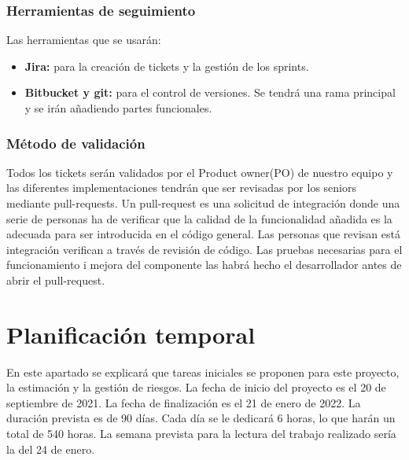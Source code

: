 \documentclass[12pt]{article}
\begin{document}
    \subsubsection{Herramientas de seguimiento}	
    Las herramientas que se usarán:
    \begin{itemize}
        \item \textbf{Jira:} para la creación de tickets y la gestión de los sprints.
        \item \textbf{Bitbucket y git:} para el control de versiones. Se tendrá una rama principal y se irán añadiendo partes funcionales.
    \end{itemize}

    \subsubsection{Método de validación}
    Todos los tickets serán validados por el Product owner(PO) de nuestro equipo y las diferentes implementaciones tendrán que ser revisadas por los seniors mediante pull-requests. Un pull-request es una solicitud de integración donde una serie de personas ha de verificar que la calidad de la funcionalidad añadida es la adecuada para ser introducida en el código general. Las personas que revisan está integración verifican a través de revisión de código. Las pruebas necesarias para el funcionamiento i mejora del componente las habrá hecho el desarrollador antes de abrir el pull-request. 
    \clearpage
    \section{Planificación temporal}\label{sec:Planificación temporal}
    En este apartado se explicará que tareas iniciales se proponen para este proyecto, la estimación y la gestión de riesgos. La fecha de inicio del proyecto es el 20 de septiembre de 2021. La fecha de finalización es el 21 de enero de 2022. La duración prevista es de 90 días. Cada día se le dedicará 6 horas, lo que harán un total de 540 horas. La semana prevista para la lectura del trabajo realizado sería la del 24 de enero. 
\end{document}
